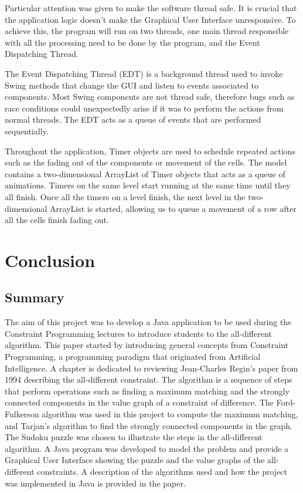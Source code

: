\documentclass{l4proj}
\begin{document}
\noindent Particular attention was given to make the software thread safe. It is crucial that the application logic doesn’t make the Graphical User Interface unresponsive. To achieve this, the program will run on two threads, one main thread responsible with all the processing need to be done by the program, and the Event Dispatching Thread. 

\noindent The Event Dispatching Thread (EDT) is a background thread used to invoke Swing methods that change the GUI and listen to events associated to components. Most Swing components are not thread safe, therefore bugs such as race conditions could unexpectedly arise if it was to perform the actions from normal threads. The EDT acts as a queue of events that are performed sequentially.

\noindent Throughout the application, Timer objects are used to schedule repeated actions such as the fading out of the components or movement of the cells. The model contains a two-dimensional ArrayList of Timer objects that acts as a queue of animations. Timers on the same level start running at the same time until they all finish. Once all the timers on a level finish, the next level in the two-dimensional ArrayList is started, allowing us to queue a movement of a row after all the cells finish fading out.

\chapter{Conclusion}
\label{chap7conclusion} 
\section{Summary}
The aim of this project was to develop a Java application to be used during the Constraint Programming lectures to introduce students to the all-different algorithm. This paper started by introducing general concepts from Constraint Programming, a programming paradigm that originated from Artificial Intelligence. A chapter is dedicated to reviewing Jean-Charles Regin's paper \cite{regin1994filtering} from 1994 describing the all-different constraint. The algorithm is a sequence of steps that perform operations such as finding a maximum matching and the strongly connected components in the value graph of a constraint of difference. The Ford-Fulkerson algorithm was used in this project to compute the maximum matching, and Tarjan's algorithm to find the strongly connected components in the graph. The Sudoku puzzle was chosen to illustrate the steps in the all-different algorithm. A Java program was developed to model the problem and provide a Graphical User Interface showing the puzzle and the value graphs of the all-different constraints. A description of the algorithms used and how the project was implemented in Java is provided in the paper.
\end{document}
